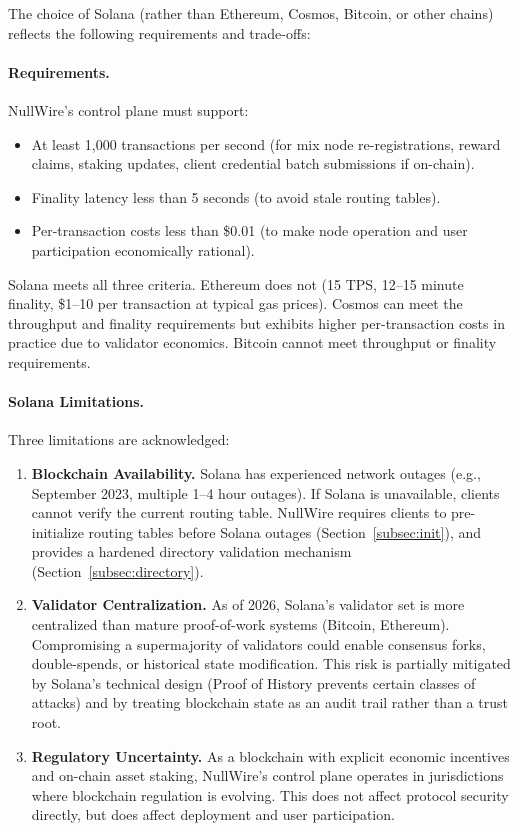 \documentclass[11pt]{article}
\theoremstyle{definition}
\theoremstyle{remark}
\begin{document}
The choice of Solana (rather than Ethereum, Cosmos, Bitcoin, or other chains) reflects the following requirements and trade-offs:

\paragraph{Requirements.} NullWire's control plane must support:
\begin{itemize}
    \item At least 1,000 transactions per second (for mix node re-registrations, reward claims, staking updates, client credential batch submissions if on-chain).
    \item Finality latency less than 5 seconds (to avoid stale routing tables).
    \item Per-transaction costs less than \$0.01 (to make node operation and user participation economically rational).
\end{itemize}

Solana meets all three criteria. Ethereum does not (15 TPS, 12--15 minute finality, \$1--10 per transaction at typical gas prices). Cosmos can meet the throughput and finality requirements but exhibits higher per-transaction costs in practice due to validator economics. Bitcoin cannot meet throughput or finality requirements.

\paragraph{Solana Limitations.} Three limitations are acknowledged:

\begin{enumerate}
    \item \textbf{Blockchain Availability.} Solana has experienced network outages (e.g., September 2023, multiple 1--4 hour outages). If Solana is unavailable, clients cannot verify the current routing table. NullWire requires clients to pre-initialize routing tables before Solana outages (Section~\ref{subsec:init}), and provides a hardened directory validation mechanism (Section~\ref{subsec:directory}).

    \item \textbf{Validator Centralization.} As of 2026, Solana's validator set is more centralized than mature proof-of-work systems (Bitcoin, Ethereum). Compromising a supermajority of validators could enable consensus forks, double-spends, or historical state modification. This risk is partially mitigated by Solana's technical design (Proof of History prevents certain classes of attacks) and by treating blockchain state as an audit trail rather than a trust root.

    \item \textbf{Regulatory Uncertainty.} As a blockchain with explicit economic incentives and on-chain asset staking, NullWire's control plane operates in jurisdictions where blockchain regulation is evolving. This does not affect protocol security directly, but does affect deployment and user participation.
\end{enumerate}
\end{document}
